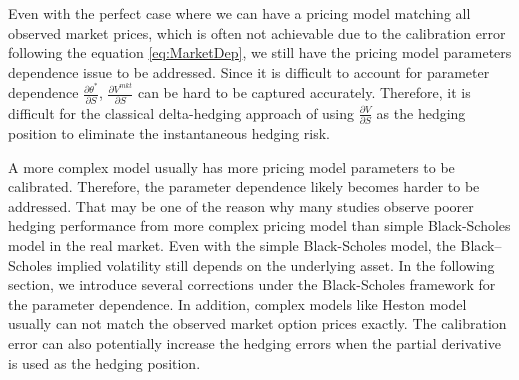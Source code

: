 \documentclass[letterpaper,12pt,titlepage,oneside,final]{book}
\numberwithin{equation}{section}
\theoremstyle{definition}
\newcommand{\Vmkt}{V^{mkt}}
\begin{document}
Even with the perfect case where we can have a pricing model matching all observed market prices, which is often not achievable due to the calibration error following the equation \eqref{eq:MarketDep},
we still have  the pricing model parameters dependence issue to be addressed. Since it is difficult to account for parameter dependence $\frac{\partial \theta^*}{\partial S}$,  $\frac{\partial \Vmkt}{\partial S} $ can be hard to be captured accurately. Therefore, it is difficult for the classical delta-hedging approach of using $\frac{\partial V}{\partial S}$ as the hedging position to  eliminate the instantaneous hedging risk.

A more complex model usually has more pricing model parameters to be calibrated. Therefore, the parameter dependence likely becomes harder to be addressed. That may be one of the reason why many studies observe poorer hedging performance from more complex pricing model than simple Black-Scholes model in the real market. Even with the simple Black-Scholes model, the Black–Scholes implied volatility still depends on the underlying asset. In the following section, we introduce several corrections under the Black-Scholes framework for the parameter dependence. In addition, complex models like Heston model usually can not match the observed market option prices exactly. The calibration error can also potentially increase the hedging errors when the partial derivative is used as the hedging position.  
\end{document}
